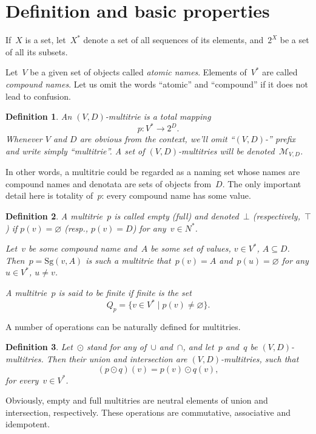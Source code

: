 \documentclass{article}
\newtheorem{Df}{Definition}
\newcommand{\mtempty}{\bot}
\newcommand{\mtfull}{\top}
\newcommand{\set}[1]{\mathcal{#1}}
\newcommand{\setmt}[2]{\set{M}_{#1,#2}}
\newcommand{\singleleaf}{\mathrm{Sg}}
\begin{document}
\section{Definition and basic properties}

If~$X$ is a set, let~$X^\ast$ denote a set of all sequences of its elements,
and~$2^X$ be a set of all its subsets.

Let~$V$ be a given set of objects called \emph{atomic names}. Elements
of~$V^\ast$ are called \emph{compound names}. Let us omit the words ``atomic''
and ``compound'' if it does not lead to confusion.

\begin{Df}
An \emph{$(V,D)$-multitrie} is a total mapping
\[
  p : V^\ast \to 2^D .
\]
Whenever $V$ and $D$ are obvious from the context, we'll omit ``$(V,D)$-''
prefix and write simply ``multitrie''. A set of $(V,D)$-multitries will be
denoted~$\setmt{V}{D}$.
\end{Df}

In other words, a multitrie could be regarded as a naming set whose names are
compound names and denotata are sets of objects from~$D$. The only important
detail here is totality of~$p$: every compound name has some value.

\begin{Df}
A multitrie~$p$ is called \emph{empty} (\emph{full}) and denoted~$\mtempty$
(respectively,~$\mtfull$) if $p(v)=\varnothing$ (resp., $p(v)=D$) for any~$v\in
N^\ast$.

Let~$v$ be some compound name and~$A$ be some set of values, $v\in V^\ast$,
$A\subseteq D$.  Then~$p = \singleleaf(v,A)$ is such a multitrie that~$p(v) =
A$ and~$p(u) = \varnothing$ for any $u\in V^\ast$, $u\neq v$.

A multitrie~$p$ is said to be \emph{finite} if finite is the set
\[
  Q_p = \{ v \in V^\ast \mid p(v) \neq \varnothing \} .
\]
\end{Df}

A number of operations can be naturally defined for multitries.

\begin{Df}
Let~$\odot$ stand for any of~$\cup$ and~$\cap$, and let~$p$ and~$q$ be
$(V,D)$-multitries. Then their \emph{union} and \emph{intersection} are
$(V,D)$-multitries, such that
\[
  (p\odot q)(v) = p(v) \odot q(v) ,
\]
for every~$v\in V^\ast$.
\end{Df}

Obviously, empty and full multitries are neutral elements of union and intersection,
respectively. These operations are commutative, associative and idempotent.
\end{document}
